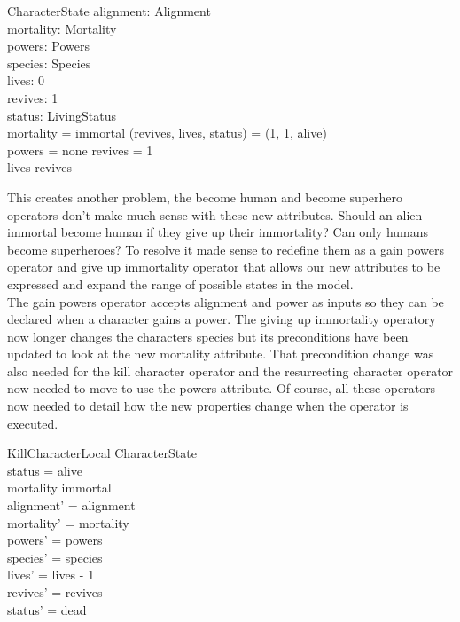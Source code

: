 \documentclass{article}
\begin{document}
\begin{schema}{CharacterState}
alignment: Alignment \\
mortality: Mortality \\
powers: Powers \\
species: Species \\
lives: 0   \\ 
revives: 1  \\ 
status: LivingStatus \\
\where
mortality = immortal \implies (revives, lives, status) = (1, 1, alive) \\
powers = none \implies revives = 1 \\ 
lives \leq revives \\
\end{schema}

\hspace{-0.64cm} This creates another problem, the become human and become superhero operators don’t make much sense with these new attributes. Should an alien immortal become human if they give up their immortality? Can only humans become superheroes? To resolve it made sense to redefine them as a gain powers operator and give up immortality operator that allows our new attributes to be expressed and expand the range of possible states in the model. \\
\newline
The gain powers operator accepts alignment and power as inputs so they can be declared when a character gains a power. The giving up immortality operatory now longer changes the characters species but its preconditions have been updated to look at the new mortality attribute. That precondition change was also needed for the kill character operator and the resurrecting character operator now needed to move to use the powers attribute. Of course, all these operators now needed to detail how the new properties change when the operator is executed. \\

\begin{schema}{KillCharacterLocal} 
\Delta CharacterState \\
\where
status = alive \\
mortality \neq immortal \\
alignment' = alignment \\
mortality' = mortality \\
powers' = powers \\ 
species' = species \\
lives' = lives - 1 \\
revives' = revives \\
status' = dead \\
\end{schema}
\end{document}
